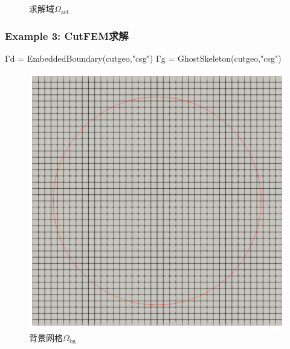 \documentclass[lang=en,aspectratio=43,theme=default,logo=on]{simplebeamer}
\begin{document}
\begin{frame}[fragile]
\begin{figure}
\begin{minipage}[t]{0.5\linewidth}
        \caption{求解域$\Omega_{\mathrm{act}}$}
    \end{minipage}
\end{figure}
\end{frame}

\begin{frame}[fragile]
    \frametitle{Example 3: CutFEM求解}
\begin{code}
Γd = EmbeddedBoundary(cutgeo,"csg")
Γg = GhostSkeleton(cutgeo,"csg")
\end{code}
\begin{figure}
    \centering %
    \begin{minipage}[t]{0.5\linewidth}
        \centering
        \includegraphics[height=0.5\textheight]{./img/011.png}
        \caption{背景网格$\Omega_{\mathrm{bg}}$}
    \end{minipage}%
    \begin{minipage}[t]{0.5\linewidth}
        \centering

\end{minipage}
\end{figure}
\end{frame}
\end{document}
